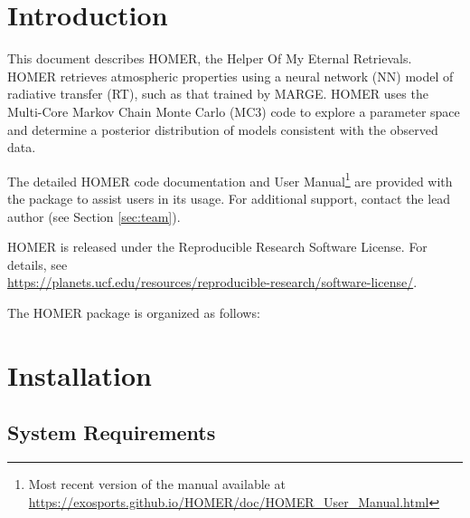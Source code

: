 \documentclass[letterpaper, 12pt]{article}
\begin{document}
\section{Introduction}
\label{sec:theory}

\noindent This document describes HOMER, the Helper Of My Eternal Retrievals.
HOMER retrieves atmospheric properties using a neural network (NN) model of 
radiative transfer (RT), such as that trained by MARGE.  HOMER uses the 
Multi-Core Markov Chain Monte Carlo (MC3) code to explore a parameter space 
and determine a posterior distribution of models consistent with the observed 
data.

The detailed HOMER code documentation and User Manual\footnote{Most recent version of the manual available at 
\href{https://exosports.github.io/HOMER/doc/HOMER_User_Manual.html}{https://exosports.github.io/HOMER/doc/HOMER\_User\_Manual.html}} 
are provided with the package to assist users in its usage. 
For additional support, contact the lead author (see Section \ref{sec:team}).

HOMER is released under the Reproducible Research Software License.  
For details, see \\
\href{https://planets.ucf.edu/resources/reproducible-research/software-license/}{https://planets.ucf.edu/resources/reproducible-research/software-license/}.
\newline

\noindent The HOMER package is organized as follows: \newline
\noindent{}
\vspace{0.7cm}

\section{Installation}
\label{sec:installation}

\subsection{System Requirements}
\label{sec:requirements}
\end{document}
